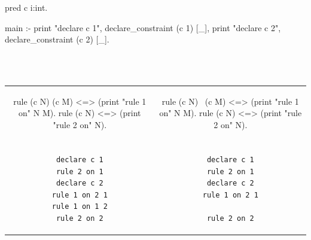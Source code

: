 \documentclass{these-ISSS}
\newenvironment{elpicode}
  {\VerbatimEnvironment\begin{elpibox}\begin{xelpicode}}{\end{xelpicode}
\end{elpibox}}
\newenvironment{chrcode}
  {\VerbatimEnvironment\begin{chrbox}\begin{xelpicode}}{\end{xelpicode}
  \end{chrbox}}
\begin{document}
\begin{center}\begin{minipage}{.6\textwidth}
\begin{elpicode}
pred c i:int.

main :-
  print "declare c 1",
  declare_constraint (c 1) [_],
  print "declare c 2",
  declare_constraint (c 2) [_].
\end{elpicode}
\end{minipage}
~\\
\vspace{1em}
~\\
\bgroup
\setlength{\tabcolsep}{1em}
\begin{tabular}{c c}
\begin{minipage}{.44\textwidth}
\begin{chrcode}
rule (c N) (c M) <=>
  (print "rule 1 on" N M).
rule (c N) <=>
  (print "rule 2 on" N).
\end{chrcode}
\end{minipage} &
\begin{minipage}{.44\textwidth}
\begin{chrcode}
rule (c N) \ (c M) <=>
  (print "rule 1 on" N M).
rule (c N) <=>
  (print "rule 2 on" N).
\end{chrcode}
\end{minipage} \\
\\
\vspace{1em}
\begin{minipage}{.44\textwidth}
\begin{outputbox}
\begin{verbatim}
declare c 1
rule 2 on 1
declare c 2
rule 1 on 2 1
rule 1 on 1 2
rule 2 on 2
\end{verbatim}
\end{outputbox}
\end{minipage} &
\begin{minipage}{.44\textwidth}
\begin{outputbox}
\begin{verbatim}
declare c 1
rule 2 on 1
declare c 2
rule 1 on 2 1

rule 2 on 2
\end{verbatim}
\end{outputbox}
\end{minipage}
\end{tabular}
\egroup
\end{center}
~\\
\end{document}
